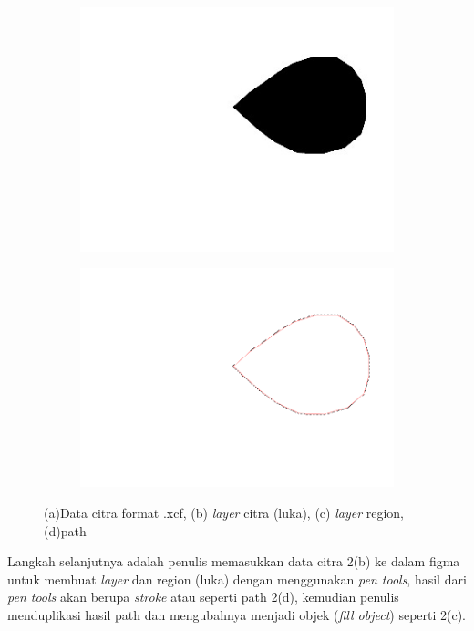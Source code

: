 \begin{figure}[H]
\begin{subfigure}{0.2\textwidth}
		\caption{}
	  \end{subfigure}  
	  \begin{subfigure}{0.2\textwidth}
		\centering{}
		\includegraphics[width=\textwidth]{gambar/gambar-3_2(c).jpg}
		\caption{}
	  \end{subfigure}
	  \begin{subfigure}{0.2\textwidth}
		\centering{}
		\includegraphics[width=\textwidth]{gambar/gambar-3_2(d).png}
		\caption{}
	  \end{subfigure}  
	\caption{
		(a)Data citra format .xcf, (b) \emph{layer} citra (luka), (c) \emph{layer} 
		region, (d)path
	 }
  \end{figure}

Langkah selanjutnya adalah penulis memasukkan data citra 2(b) ke dalam figma untuk
membuat \emph{layer} dan region (luka) dengan menggunakan \emph{pen tools}, hasil 
dari \emph{pen tools} akan berupa \emph{stroke} atau seperti path 2(d), kemudian 
penulis menduplikasi hasil path dan mengubahnya menjadi objek (\emph{fill object})
seperti 2(c).

